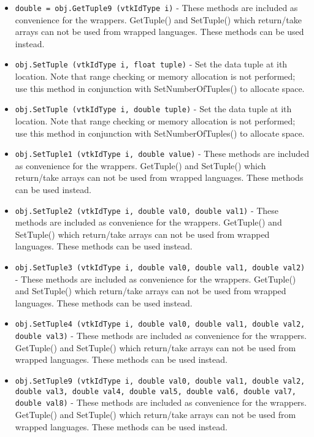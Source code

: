 \begin{itemize}
\item  \verb|double = obj.GetTuple9 (vtkIdType i)| -  These methods are included as convenience for the wrappers.
 GetTuple() and SetTuple() which return/take arrays can not be 
 used from wrapped languages. These methods can be used instead.

\item  \verb|obj.SetTuple (vtkIdType i, float tuple)| -  Set the data tuple at ith location. Note that range checking or
 memory allocation is not performed; use this method in conjunction
 with SetNumberOfTuples() to allocate space.

\item  \verb|obj.SetTuple (vtkIdType i, double tuple)| -  Set the data tuple at ith location. Note that range checking or
 memory allocation is not performed; use this method in conjunction
 with SetNumberOfTuples() to allocate space.

\item  \verb|obj.SetTuple1 (vtkIdType i, double value)| -  These methods are included as convenience for the wrappers.
 GetTuple() and SetTuple() which return/take arrays can not be 
 used from wrapped languages. These methods can be used instead.

\item  \verb|obj.SetTuple2 (vtkIdType i, double val0, double val1)| -  These methods are included as convenience for the wrappers.
 GetTuple() and SetTuple() which return/take arrays can not be 
 used from wrapped languages. These methods can be used instead.

\item  \verb|obj.SetTuple3 (vtkIdType i, double val0, double val1, double val2)| -  These methods are included as convenience for the wrappers.
 GetTuple() and SetTuple() which return/take arrays can not be 
 used from wrapped languages. These methods can be used instead.

\item  \verb|obj.SetTuple4 (vtkIdType i, double val0, double val1, double val2, double val3)| -  These methods are included as convenience for the wrappers.
 GetTuple() and SetTuple() which return/take arrays can not be 
 used from wrapped languages. These methods can be used instead.

\item  \verb|obj.SetTuple9 (vtkIdType i, double val0, double val1, double val2, double val3, double val4, double val5, double val6, double val7, double val8)| -  These methods are included as convenience for the wrappers.
 GetTuple() and SetTuple() which return/take arrays can not be 
 used from wrapped languages. These methods can be used instead.


\end{itemize}
